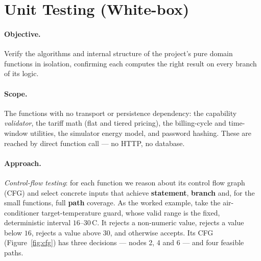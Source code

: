 \section{Unit Testing (White-box)}
\label{sec:qa-unit}

\paragraph{Objective.} Verify the algorithms and internal structure of the
project's pure domain functions in isolation, confirming each computes the right
result on every branch of its logic.

\paragraph{Scope.} The functions with no transport or persistence dependency: the
capability \emph{validator}, the tariff math (flat and tiered pricing), the
billing-cycle and time-window utilities, the simulator energy model, and password
hashing. These are reached by direct function call --- no HTTP, no database.

\paragraph{Approach.} \emph{Control-flow testing}: for each function we reason
about its control flow graph (CFG) and select concrete inputs that achieve
\textbf{statement}, \textbf{branch} and, for the small functions, full
\textbf{path} coverage. As the worked example, take the air-conditioner
target-temperature guard, whose valid range is the fixed, deterministic interval
$16$--$30\,$\textdegree C. It rejects a non-numeric value, rejects a value below
$16$, rejects a value above $30$, and otherwise accepts. Its CFG
(Figure~\ref{fig:cfg}) has three decisions --- nodes 2, 4 and 6 --- and four
feasible paths.

